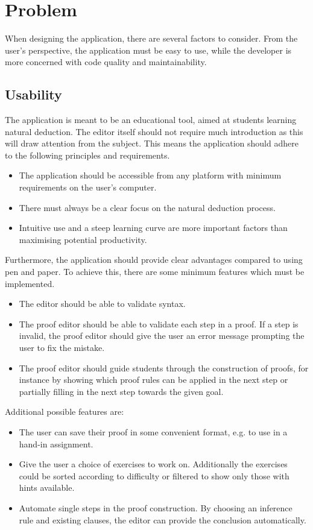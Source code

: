 \section{Problem}

When designing the application, there are several factors to consider. From the user's perspective, the application must be easy to use, while the developer is more concerned with code quality and maintainability.

\subsection{Usability}
The application is meant to be an educational tool, aimed at students learning natural deduction. The editor itself should not require much introduction as this will draw attention from the subject. This means the application should adhere to the following principles and requirements.

\begin{itemize}
    \item The application should be accessible from any platform with minimum requirements on the user's computer.
    \item There must always be a clear focus on the natural deduction process.
    \item Intuitive use and a steep learning curve are more important factors than maximising potential productivity.
\end{itemize}

Furthermore, the application should provide clear advantages compared to using pen and paper. To achieve this, there are some minimum features which must be implemented.

\begin{itemize}
    \item The editor should be able to validate syntax.
    \item The proof editor should be able to validate each step in a proof. If a step is invalid, the proof editor should give the user an error message prompting the user to fix the mistake.
    \item The proof editor should guide students through the construction of proofs, for instance by showing which proof rules can be applied in the next step or partially filling in the next step towards the given goal.
\end{itemize}

Additional possible features are:
\begin{itemize}
    \item The user can save their proof in some convenient format, e.g. to use in a hand-in assignment.
    \item Give the user a choice of exercises to work on. Additionally the exercises could be sorted according to difficulty or filtered to show only those with hints available.
    \item Automate single steps in the proof construction. By choosing an inference rule and existing clauses, the editor can provide the conclusion automatically.
\end{itemize}

